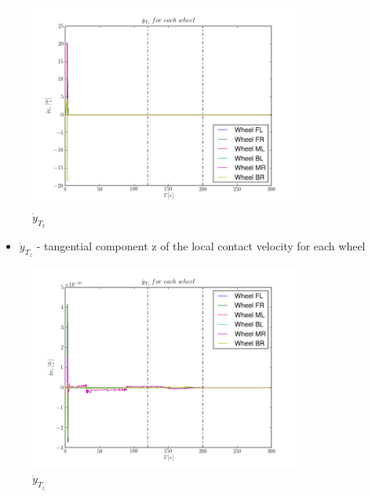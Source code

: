 \begin{figure}[H]
  \centering
    \includegraphics[width=0.8\textwidth]{yTxdots5}
  \caption{$\dot{y}_{T_x}$}
\end{figure}

\begin{itemize}
  \item $\dot{y}_{T_z}$ - tangential component z of the local contact velocity for each wheel
\end{itemize}

\begin{figure}[H]
  \centering
    \includegraphics[width=0.8\textwidth]{yTzdots5}
  \caption{$\dot{y}_{T_z}$}
\end{figure}

